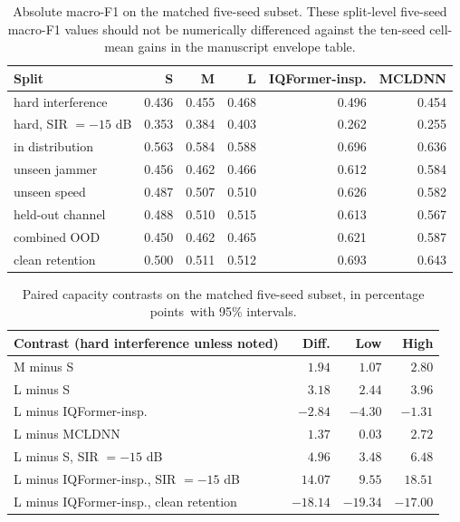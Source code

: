 \documentclass[letterpaper,onecolumn,11pt,journal]{IEEEtran}
\newcommand{\pp}{percentage points}
\begin{document}
\begin{table}[t]
\centering
\caption{Absolute macro-F1 on the matched five-seed subset. These split-level
five-seed macro-F1 values should not be numerically differenced against the
ten-seed cell-mean gains in the manuscript envelope table.}
\label{tab:capabs}
\footnotesize
\setlength{\tabcolsep}{4pt}
\begin{tabular}{lrrrrr}
\toprule
Split & S & M & L & IQFormer-insp. & MCLDNN\\
\midrule
hard interference & 0.436 & 0.455 & 0.468 & 0.496 & 0.454\\
hard, SIR $=-15$ dB & 0.353 & 0.384 & 0.403 & 0.262 & 0.255\\
in distribution & 0.563 & 0.584 & 0.588 & 0.696 & 0.636\\
unseen jammer & 0.456 & 0.462 & 0.466 & 0.612 & 0.584\\
unseen speed & 0.487 & 0.507 & 0.510 & 0.626 & 0.582\\
held-out channel & 0.488 & 0.510 & 0.515 & 0.613 & 0.567\\
combined OOD & 0.450 & 0.462 & 0.465 & 0.621 & 0.587\\
clean retention & 0.500 & 0.511 & 0.512 & 0.693 & 0.643\\
\bottomrule
\end{tabular}
\end{table}

\begin{table}[t]
\centering
\caption{Paired capacity contrasts on the matched five-seed subset, in \pp\
with 95\% intervals.}
\label{tab:capdiff}
\footnotesize
\setlength{\tabcolsep}{4pt}
\begin{tabular}{lrrr}
\toprule
Contrast (hard interference unless noted) & Diff. & Low & High\\
\midrule
M minus S & $1.94$ & $1.07$ & $2.80$\\
L minus S & $3.18$ & $2.44$ & $3.96$\\
L minus IQFormer-insp. & $-2.84$ & $-4.30$ & $-1.31$\\
L minus MCLDNN & $1.37$ & $0.03$ & $2.72$\\
L minus S, SIR $=-15$ dB & $4.96$ & $3.48$ & $6.48$\\
L minus IQFormer-insp., SIR $=-15$ dB & $14.07$ & $9.55$ & $18.51$\\
L minus IQFormer-insp., clean retention & $-18.14$ & $-19.34$ & $-17.00$\\
\bottomrule
\end{tabular}
\end{table}
\end{document}
